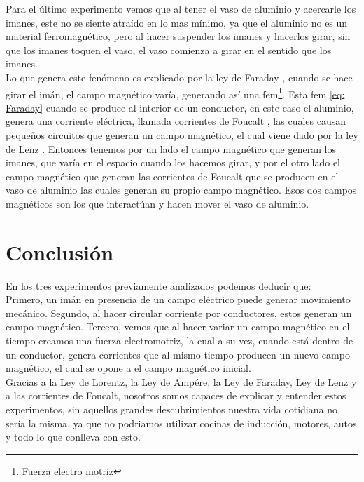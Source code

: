 \documentclass[]{article}
\begin{document}
\begin{multicols*}{2}
\vspace{0.3cm}
Para el último experimento vemos que al tener el vaso de aluminio y acercarle los imanes, este no se siente atraído en lo mas mínimo, ya que el aluminio no es un material ferromagnético, pero al hacer suspender los imanes y hacerlos girar, sin que los imanes toquen el vaso, el vaso comienza 
a girar en el sentido que  los imanes. \\ 
Lo que genera este fenómeno es explicado por la ley de Faraday \cite{Ley-de-Faraday}, cuando se hace girar el imán, el  campo magnético varía, generando así una fem\footnote[1]{Fuerza electro motriz}.
Esta fem \eqref{eq: Faraday} cuando se produce al interior de un conductor, en este caso el aluminio,  genera una corriente eléctrica, llamada corrientes de Foucalt \cite{Corrientes-de-Foucault}, las cuales 
causan pequeños circuitos que generan un campo magnético, el cual viene dado por la ley de Lenz \cite{Ley-de-Faraday}.
Entonces tenemos por un lado el campo magnético que generan los imanes, que varía en el espacio cuando los hacemos girar, y por el otro lado el campo magnético que generan las corrientes de Foucalt que se producen en el vaso de aluminio las cuales generan su propio campo magnético. Esos dos campos magnéticos son los que interactúan y hacen mover el vaso de aluminio.



\section*{Conclusión}
En los tres experimentos previamente analizados podemos deducir que: \\ Primero, un imán en presencia de un campo eléctrico puede generar movimiento mecánico. Segundo, al hacer circular corriente por conductores, estos generan un campo magnético. Tercero, vemos que al hacer variar un campo magnético en el tiempo creamos una fuerza electromotriz, la cual a su vez, cuando está dentro de un conductor, genera corrientes que al mismo tiempo producen un nuevo campo magnético,
el cual se opone a el campo magnético inicial. \\ Gracias a la Ley de Lorentz, la Ley de Ampére, la Ley de Faraday, Ley de Lenz y a las corrientes de Foucalt, nosotros somos capaces de explicar y entender estos experimentos, sin aquellos grandes descubrimientos nuestra vida cotidiana no sería la misma, ya que no podriamos utilizar cocinas de inducción, motores, autos y todo lo que conlleva con esto.






\end{multicols*}
\end{document}
